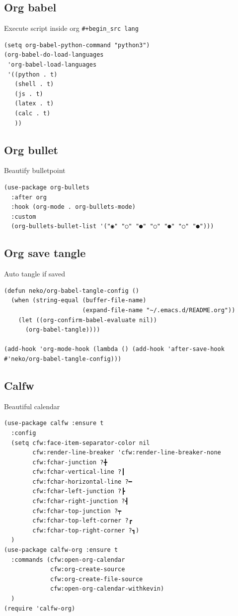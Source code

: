 \documentclass[11pt]{article}
\begin{document}
\subsection{Org babel}
\label{sec:org3712a69}

Execute script inside org \texttt{\#+begin\_src lang}

\begin{verbatim}
(setq org-babel-python-command "python3")
(org-babel-do-load-languages
 'org-babel-load-languages
 '((python . t)
   (shell . t)
   (js . t)
   (latex . t)
   (calc . t)
   ))
\end{verbatim}

\subsection{Org bullet}
\label{sec:orga996812}

Beautify bulletpoint

\begin{verbatim}
(use-package org-bullets
  :after org
  :hook (org-mode . org-bullets-mode)
  :custom
  (org-bullets-bullet-list '("◉" "○" "●" "○" "●" "○" "●")))
\end{verbatim}

\subsection{Org save tangle}
\label{sec:orgb9c27e6}

Auto tangle if saved

\begin{verbatim}
(defun neko/org-babel-tangle-config ()
  (when (string-equal (buffer-file-name)
                      (expand-file-name "~/.emacs.d/README.org"))
    (let ((org-confirm-babel-evaluate nil))
      (org-babel-tangle))))

(add-hook 'org-mode-hook (lambda () (add-hook 'after-save-hook #'neko/org-babel-tangle-config)))
\end{verbatim}

\subsection{Calfw}
\label{sec:orge6ea25c}

Beautiful calendar

\begin{verbatim}
(use-package calfw :ensure t
  :config
  (setq cfw:face-item-separator-color nil
        cfw:render-line-breaker 'cfw:render-line-breaker-none
        cfw:fchar-junction ?╋
        cfw:fchar-vertical-line ?┃
        cfw:fchar-horizontal-line ?━
        cfw:fchar-left-junction ?┣
        cfw:fchar-right-junction ?┫
        cfw:fchar-top-junction ?┯
        cfw:fchar-top-left-corner ?┏
        cfw:fchar-top-right-corner ?┓)
  )
(use-package calfw-org :ensure t
  :commands (cfw:open-org-calendar
             cfw:org-create-source
             cfw:org-create-file-source
             cfw:open-org-calendar-withkevin)
  )
(require 'calfw-org)
\end{verbatim}
\end{document}

